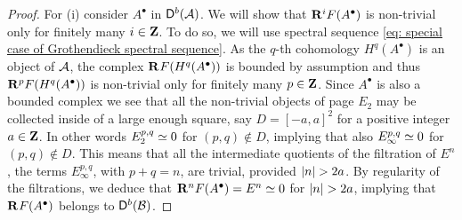\begin{proof}
    For (i) consider $A^\bullet$ in $\mathsf{D}^b(\mathcal A)$. We will show that $\mathbf{R}^{i}F(A^\bullet)$ is non-trivial only for finitely many $i \in \mathbf Z$. To do so, we will use spectral sequence \eqref{eq: special case of Grothendieck spectral sequence}. As the $q$-th cohomology $H^q(A^\bullet)$ is an object of $\mathcal A$, the complex $\mathbf{R}^{}F(H^q(A^\bullet))$ is bounded by assumption and thus $\mathbf{R}^{p}F(H^q(A^\bullet))$ is non-trivial only for finitely many $p \in \mathbf Z$. Since $A^\bullet$ is also a bounded complex we see that all the non-trivial objects of page $E_2$ may be collected inside of a large enough square, 
    say $D = [-a, a]^2$ for a positive integer $a \in \mathbf Z$.
    In other words $E^{p,q}_2 \simeq 0$ for $(p,q) \notin D$, implying that also $E^{p,q}_\infty \simeq 0$ for $(p,q) \notin D$. This means that all the intermediate quotients of the filtration of $E^n$, \ie the terms $E^{p,q}_\infty$, with $p + q = n$, are trivial, provided $\left\lvert n \right\rvert > 2a$. By regularity of the filtrations, we deduce that $\mathbf{R}^{n}F(A^\bullet) = E^n \simeq 0$ for $\left\lvert n \right\rvert > 2a$, implying that $\mathbf{R}^{}F(A^\bullet)$ belongs to $\mathsf{D}^b(\mathcal B)$.
    

\end{proof}
